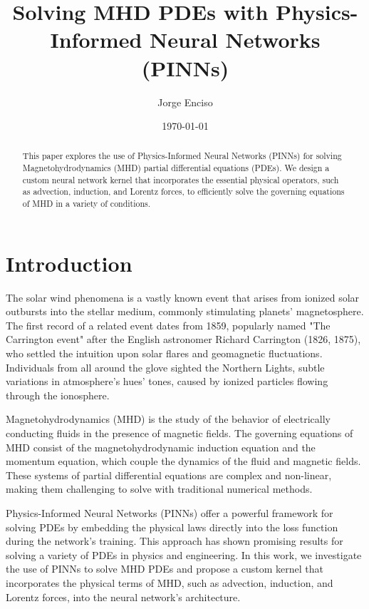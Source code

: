 \documentclass[12pt]{article}
\title{Solving MHD PDEs with Physics-Informed Neural Networks (PINNs)}
\author{Jorge Enciso}
\date{\today}
\begin{document}
\maketitle

\begin{abstract}
This paper explores the use of Physics-Informed Neural Networks (PINNs) for solving Magnetohydrodynamics (MHD) partial differential equations (PDEs). We design a custom neural network kernel that incorporates the essential physical operators, such as advection, induction, and Lorentz forces, to efficiently solve the governing equations of MHD in a variety of conditions.
\end{abstract}

\tableofcontents
\newpage

\section{Introduction}
The solar wind phenomena is a vastly known event that arises from ionized solar outbursts into the stellar medium, commonly stimulating planets' magnetosphere. \cite{Gosling2007} The first record of a related event dates from 1859, popularly named "The Carrington event" after the English astronomer Richard Carrington (1826, 1875), who settled the intuition upon solar flares and geomagnetic fluctuations. Individuals from all around the glove sighted the Northern Lights, subtle variations in atmosphere's hues' tones, caused by ionized particles flowing through the ionosphere.

Magnetohydrodynamics (MHD) is the study of the behavior of electrically conducting fluids in the presence of magnetic fields. The governing equations of MHD consist of the magnetohydrodynamic induction equation and the momentum equation, which couple the dynamics of the fluid and magnetic fields. These systems of partial differential equations are complex and non-linear, making them challenging to solve with traditional numerical methods.

Physics-Informed Neural Networks (PINNs) offer a powerful framework for solving PDEs by embedding the physical laws directly into the loss function during the network's training. This approach has shown promising results for solving a variety of PDEs in physics and engineering. In this work, we investigate the use of PINNs to solve MHD PDEs and propose a custom kernel that incorporates the physical terms of MHD, such as advection, induction, and Lorentz forces, into the neural network's architecture.
\end{document}
